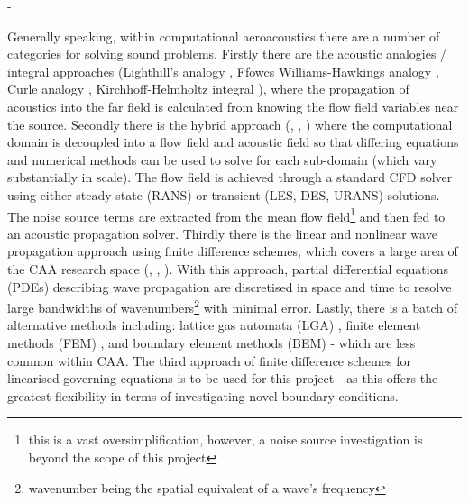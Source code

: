 
 - \textcite{tam193DRP}


Generally speaking, within computational aeroacoustics there are a number of categories for solving sound problems. Firstly there are the acoustic analogies / integral approaches (Lighthill's analogy \cite{lighthill1952onsoundsgenerated}, Ffowcs Williams-Hawkings analogy \cite{ffowcswilliams1969soundgenerationturb}, Curle analogy \cite{curle1955influencesolid}, Kirchhoff-Helmholtz integral \cite{godin1996kirchhoffhelmholtz}), where the propagation of acoustics into the far field is calculated from knowing the flow field variables near the source. Secondly there is the hybrid approach (\textcite{hardin1994acousticsplitting}, \textcite{shen1999commentpopeformulation}, \textcite{ekaterinaris1999newformulationhardinpope}) where the computational domain is decoupled into a flow field and acoustic field so that differing equations and numerical methods can be used to solve for each sub-domain (which vary substantially in scale). The flow field is achieved through a standard CFD solver using either steady-state (RANS) or transient (LES, DES, URANS) solutions. The noise source terms are extracted from the mean flow field\footnote[1]{this is a vast oversimplification, however, a noise source investigation is beyond the scope of this project} and then fed to an acoustic propagation solver. Thirdly there is the linear and nonlinear wave propagation approach using finite difference schemes, which covers a large area of the CAA research space (\textcite{tam2012computational}, \textcite{zingg1996reviewFD}, \textcite{kubratskii2004reviewcaaalgo}). With this approach, partial differential equations (PDEs) describing wave propagation are discretised in space and time to resolve large bandwidths of wavenumbers\footnote[2]{wavenumber being the spatial equivalent of a wave's frequency} with minimal error. Lastly, there is a batch of alternative methods including: lattice gas automata (LGA) \cite{doolen1991LGM}, finite element methods (FEM) \cite{peyret2001FEMCAA}, and boundary element methods (BEM) \cite{kirkup2019BEMCAA} - which are less common within CAA. The third approach of finite difference schemes for linearised governing equations is to be used for this project - as this offers the greatest flexibility in terms of investigating novel boundary conditions.


